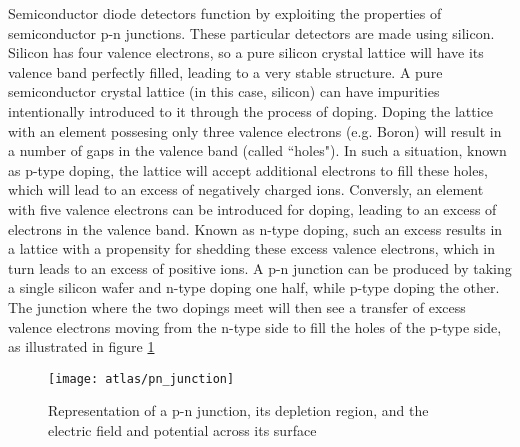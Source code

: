         

        Semiconductor diode detectors function by exploiting the properties of semiconductor p-n junctions.
        These particular detectors are made using silicon.
        Silicon has four valence electrons, so a pure silicon crystal lattice will have its valence band perfectly filled, leading to a very stable structure.
        A pure semiconductor crystal lattice (in this case, silicon) can have impurities intentionally introduced to it through the process of doping.
        Doping the lattice with an element possesing only three valence electrons (e.g. Boron) will result in a number of gaps in the valence band (called ``holes").
        In such a situation, known as p-type doping, the lattice will accept additional electrons to fill these holes, which will lead to an excess of negatively charged ions.
        Conversly, an element with five valence electrons can be introduced for doping, leading to an excess of electrons in the valence band.
        Known as n-type doping, such an excess results in a lattice with a propensity for shedding these excess valence electrons, which in turn leads to an excess of positive ions.
        A p-n junction can be produced by taking a single silicon wafer and n-type doping one half, while p-type doping the other.
        The junction where the two dopings meet will then see a transfer of excess valence electrons moving from the n-type side to fill the holes of the p-type side, as illustrated in figure \ref{fig:pn_junction}

        \begin{figure}
            \texttt{[image: atlas/pn\_junction]}
            \caption{Representation of a p-n junction, its depletion region, and the electric field and potential across its surface \cite{Havránek:2317324}}
            \label{fig:pn_junction}
        \end{figure}

